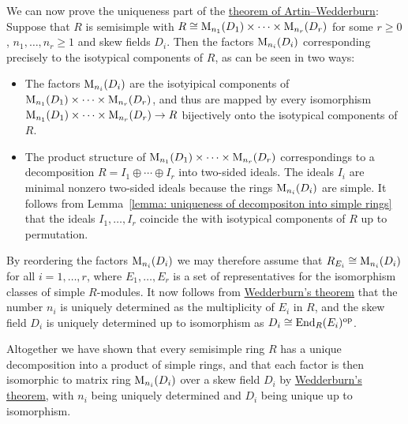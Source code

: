\begin{fluff}
  We can now prove the uniqueness part of the \hyperref[theorem: artin wedderburn theorem]{theorem of Artin--Wedderburn}:
  Suppose that $R$ is semisimple with $R \cong \operatorname{M}_{n_1}(D_1) \times \dotsb \times \operatorname{M}_{n_r}(D_r)$ for some $r \geq 0$, $n_1, \dotsc, n_r \geq 1$ and skew fields $D_i$.
  Then the factors $\operatorname{M}_{n_i}(D_i)$ corresponding precisely to the isotypical components of $R$, as can be seen in two ways:
  \begin{itemize}
    \item
      The factors $\operatorname{M}_{n_i}(D_i)$ are the isotyipical components of $\operatorname{M}_{n_1}(D_1) \times \dotsb \times \operatorname{M}_{n_r}(D_r)$, and thus are mapped by every isomorphism $\operatorname{M}_{n_1}(D_1) \times \dotsb \times \operatorname{M}_{n_r}(D_r) \to R$ bijectively onto the isotypical components of $R$.
    \item
      The product structure of $\operatorname{M}_{n_1}(D_1) \times \dotsb \times \operatorname{M}_{n_r}(D_r)$ correspondings to a decomposition $R = I_1 \oplus \dotsb \oplus I_r$ into two-sided ideals.
      The ideals $I_i$ are minimal nonzero two-sided ideals because the rings $\operatorname{M}_{n_i}(D_i)$ are simple.
      It follows from Lemma~\ref{lemma: uniqueness of decompositon into simple rings} that the ideals $I_1, \dotsc, I_r$ coincide the with isotypical components of $R$ up to permutation.
  \end{itemize}
  By reordering the factors $\operatorname{M}_{n_i}(D_i)$ we may therefore assume that $R_{E_i} \cong \operatorname{M}_{n_i}(D_i)$ for all $i = 1, \dotsc, r$, where $E_1, \dotsc, E_r$ is a set of representatives for the isomorphism classes of simple $R$-modules.
  It now follows from \hyperref[theorem: wedderburns theorem]{Wedderburn’s theorem} that the number $n_i$ is uniquely determined as the multiplicity of $E_i$ in $R$, and the skew field $D_i$ is uniquely determined up to isomorphism as $D_i \cong \operatorname{End}_R(E_i)^{\operatorname{op}}$.
\end{fluff}


\begin{fluff}
  Altogether we have shown that every semisimple ring $R$ has a unique decomposition into a product of simple rings, and that each factor is then isomorphic to matrix ring $\operatorname{M}_{n_i}(D_i)$ over a skew field $D_i$ by \hyperref[theorem: wedderburns theorem]{Wedderburn’s theorem}, with $n_i$ being uniquely determined and $D_i$ being unique up to isomorphism.
\end{fluff}


